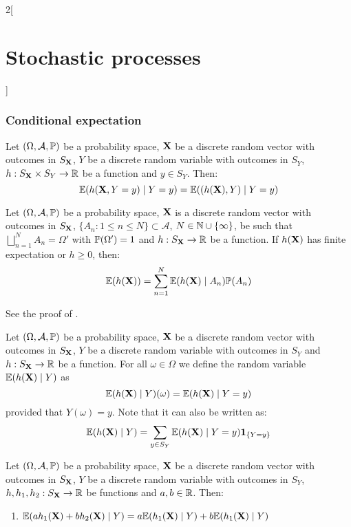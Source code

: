 \documentclass[../../../main_math.tex]{subfiles}
\begin{document}
\begin{multicols}{2}[\section{Stochastic processes}]
  \subsubsection{Conditional expectation}
  \begin{proposition}\label{SP:substitutionPrinciple}
    Let $(\Omega,\mathcal{A},\mathbb{P})$ be a probability space, $\boldsymbol{\mathrm{X}}$ be a discrete random vector with outcomes in $S_{\boldsymbol{\mathrm{X}}}$, $Y$ be a discrete random variable with outcomes in $S_Y$, $h:S_{\boldsymbol{\mathrm{X}}}\times S_Y\rightarrow\mathbb{R}$ be a function and $y\in S_Y$. Then:
    $$\mathbb{E}(h(\boldsymbol{\mathrm{X}},Y=y)\mid Y=y)=\mathbb{E}((h(\boldsymbol{\mathrm{X}}),Y)\mid Y=y)$$
  \end{proposition}
  \begin{proposition}\label{SP:totalexp}
    Let $(\Omega,\mathcal{A},\mathbb{P})$ be a probability space, $\boldsymbol{\mathrm{X}}$ is a discrete random vector with outcomes in $S_{\boldsymbol{\mathrm{X}}}$, $\{A_n:1\leq n\leq N\}\subset\mathcal{A}$, $N\in\mathbb{N}\cup\{\infty\}$, be such that $\bigsqcup_{n=1}^N A_n=\Omega'$ with $\mathbb{P}(\Omega')=1$ and $h:S_{\boldsymbol{\mathrm{X}}}\rightarrow\mathbb{R}$ be a function. If $h(\boldsymbol{\mathrm{X}})$ has finite expectation or $h\geq 0$, then: $$\mathbb{E}(h(\boldsymbol{\mathrm{X}}))=\sum_{n=1}^N\mathbb{E}(h(\boldsymbol{\mathrm{X}})\mid A_n)\mathbb{P}(A_n)$$
  \end{proposition}
  \begin{sproof}
    See the proof of .
  \end{sproof}
  \begin{definition}
    Let $(\Omega,\mathcal{A},\mathbb{P})$ be a probability space, $\boldsymbol{\mathrm{X}}$ be a discrete random vector with outcomes in $S_{\boldsymbol{\mathrm{X}}}$, $Y$ be a discrete random variable with outcomes in $S_Y$ and $h:S_{\boldsymbol{\mathrm{X}}}\rightarrow\mathbb{R}$ be a function. For all $\omega\in\Omega$ we define the random variable $\mathbb{E}(h(\boldsymbol{\mathrm{X}})\mid Y)$ as
    $$\mathbb{E}(h(\boldsymbol{\mathrm{X}})\mid Y)(\omega)=\mathbb{E}(h(\boldsymbol{\mathrm{X}})\mid Y=y)$$
    provided that $Y(\omega)=y$.
    Note that it can also be written as:
    $$\mathbb{E}(h(\boldsymbol{\mathrm{X}})\mid Y)=\sum_{y\in S_Y}\mathbb{E}(h(\boldsymbol{\mathrm{X}})\mid Y=y)\boldsymbol{\mathrm{1}}_{\{Y=y\}}$$
  \end{definition}
  \begin{proposition}
    Let $(\Omega,\mathcal{A},\mathbb{P})$ be a probability space, $\boldsymbol{\mathrm{X}}$ be a discrete random vector with outcomes in $S_{\boldsymbol{\mathrm{X}}}$, $Y$ be a discrete random variable with outcomes in $S_Y$, $h,h_1,h_2:S_{\boldsymbol{\mathrm{X}}}\rightarrow\mathbb{R}$ be functions and $a,b\in\mathbb{R}$. Then:
    \begin{enumerate}
      \item $\mathbb{E}(ah_1(\boldsymbol{\mathrm{X}})+bh_2(\boldsymbol{\mathrm{X}})\mid Y)=a\mathbb{E}(h_1(\boldsymbol{\mathrm{X}})\mid Y)+b\mathbb{E}(h_1(\boldsymbol{\mathrm{X}})\mid Y)$

\end{enumerate}
\end{proposition}
\end{multicols}
\end{document}
